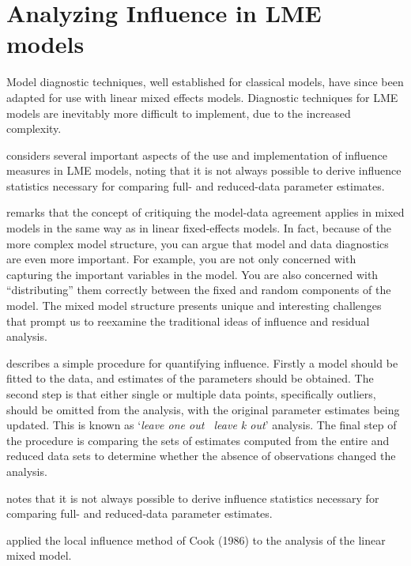 \documentclass[12pt, a4paper]{report}
\theoremstyle{plain}
\theoremstyle{definition}
\theoremstyle{remark}
\begin{document}

\section{Analyzing Influence in LME models}

Model diagnostic techniques, well established for classical models, have since been adapted for use with linear mixed effects models. Diagnostic techniques for LME models are inevitably more difficult to implement, due to the increased complexity.


\citet{schabenberger} considers several important aspects of the use and implementation of influence measures in LME models, noting that it is not always possible to
derive influence statistics necessary for comparing full- and reduced-data parameter estimates. 

\citet{schabenberger} remarks that the concept of critiquing the model-data agreement applies in mixed models in the same way as in linear
fixed-effects models. In fact, because of the more complex model structure, you can argue that model and
data diagnostics are even more important. For example, you are not only concerned with capturing the
important variables in the model. You are also concerned with ``distributing” them correctly between the
fixed and random components of the model. The mixed model structure presents unique and interesting
challenges that prompt us to reexamine the traditional ideas of influence and residual analysis.

\citet{schabenberger} describes a simple procedure for quantifying influence. Firstly a model should be fitted to the data, and
estimates of the parameters should be obtained. The second step is that either single or multiple data points, specifically outliers,
should be omitted from the analysis, with the original parameter estimates being updated. This is known as `\textit{leave one out \ leave k out}' analysis. The final step of the procedure is comparing the sets of estimates computed from the entire and reduced data sets to determine whether the absence of observations changed the
analysis.		

\citet{schabenberger} notes that it is not always possible to derive influence statistics necessary for comparing full- and
reduced-data parameter estimates. 

\citet{Beckman} applied the local influence method of Cook (1986) to the analysis of the linear mixed model.
\end{document}
